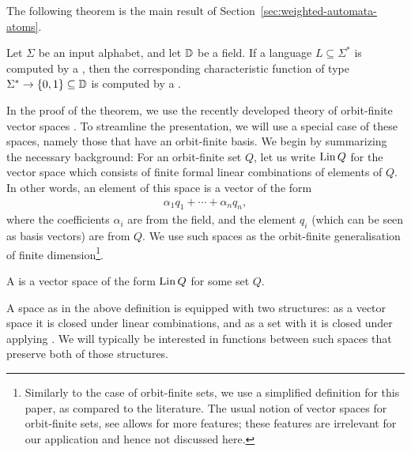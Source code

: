 The following theorem is the main result of Section~\ref{sec:weighted-automata-atoms}.
\begin{theorem}\label{thm:orbit-finite-protocol-to-weighted}
  Let $\Sigma$ be an  input alphabet, and let $\mathbb D$ be a field.
  If a language $L \subseteq \Sigma^*$ is computed by a , 
  then the corresponding characteristic function of type $\Sigma^* \to \{0,1\} \subseteq \mathbb D$
  is computed by a .
\end{theorem}

In the proof of the theorem, we use the recently developed theory of
orbit-finite vector spaces \cite{orbitFiniteVectorTheoretics}. To streamline
the presentation, we will use a special case of these spaces, namely those that
have an orbit-finite basis. We begin by summarizing the necessary background:
For an orbit-finite set $Q$, let us write $\operatorname{Lin} Q$ for the vector space
which consists of finite formal linear combinations of elements of $Q$. In
other words, an element of this space is a vector of the form 
\begin{align*}
\alpha_1 q_1 + \cdots + \alpha_n q_n,
\end{align*}
where the coefficients $\alpha_i$ are from the field, and the element $q_i$ (which can be seen as basis vectors) are from $Q$. We use such spaces as the orbit-finite generalisation of finite dimension\footnote{Similarly to the case of orbit-finite sets, we use a simplified definition for this paper, as compared to the literature. The usual notion of vector spaces for orbit-finite sets, see \cite[Definition 8.1]{bojanczyk_slightly} allows for more features; these features are irrelevant for our application and hence not discussed here.}.

\begin{definition}
    \label{def:orbit-finite-vector-space}
    \AP
    A  
    is a vector space of the form $\operatorname{Lin} Q$ for some  set $Q$.
\end{definition}
A space as in the above definition is equipped with two structures: as a vector
space it is closed under linear combinations, and as a set with  it
is closed under applying . We will typically be
interested in functions between such spaces that preserve both of those
structures.

